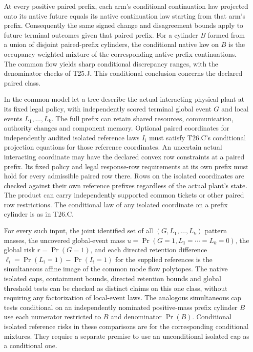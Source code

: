 \begin{theorem}
At every positive paired prefix, each arm's conditional continuation law projected onto its native future equals its native continuation law starting from that arm's prefix. Consequently the same signed change and disagreement bounds apply to future terminal outcomes given that paired prefix. For a cylinder \(B\) formed from a union of disjoint paired-prefix cylinders, the conditional native law on \(B\) is the occupancy-weighted mixture of the corresponding native prefix continuations. The common flow yields sharp conditional discrepancy ranges, with the denominator checks of T25.J. This conditional conclusion concerns the declared paired class.

\end{theorem}

\begin{theorem}\label{ext:t27j}

In the common model let a tree describe the actual interacting physical plant at its fixed legal policy, with independently scored terminal global event \(G\) and local events \(L_1,\ldots,L_k\). The full prefix can retain shared resources, communication, authority changes and component memory. Optional paired coordinates for independently audited isolated reference laws \(I_i\) must satisfy T26.C's conditional projection equations for those reference coordinates. An uncertain actual interacting coordinate may have the declared convex row constraints at a paired prefix. Its fixed policy and legal response-row requirements at its own prefix must hold for every admissible paired row there. Rows on the isolated coordinates are checked against their own reference prefixes regardless of the actual plant's state. The product can carry independently supported common tickets or other paired row restrictions. The conditional law of any isolated coordinate on a prefix cylinder is as in T26.C.

For every such input, the joint identified set of all \((G,L_1,\ldots,L_k)\) pattern masses, the uncovered global-event mass \(u=\Pr(G=1,L_1=\cdots=L_k=0)\), the global risk \(r=\Pr(G=1)\), and each directed retention difference \(\ell_i=\Pr(L_i=1)-\Pr(I_i=1)\) for the supplied references is the simultaneous affine image of the common mode flow polytopes. The native isolated caps, containment bounds, directed retention bounds and global threshold tests can be checked as distinct claims on this one class, without requiring any factorization of local-event laws. The analogous simultaneous cap tests conditional on an independently nominated positive-mass prefix cylinder \(B\) use each numerator restricted to \(B\) and denominator \(\Pr(B)\). Conditional isolated reference risks in these comparisons are for the corresponding conditional mixtures. They require a separate premise to use an unconditional isolated cap as a conditional one.


\end{theorem}
